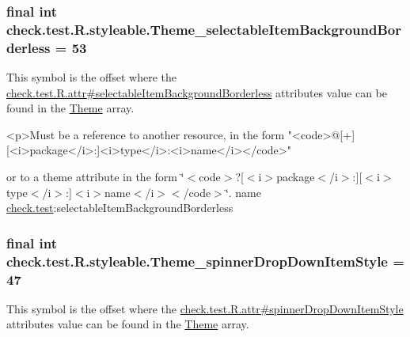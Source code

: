 \subsubsection[{Theme\+\_\+selectable\+Item\+Background\+Borderless}]{\setlength{\rightskip}{0pt plus 5cm}final int check.\+test.\+R.\+styleable.\+Theme\+\_\+selectable\+Item\+Background\+Borderless = 53\hspace{0.3cm}{\ttfamily [static]}}\label{classcheck_1_1test_1_1_r_1_1styleable_ab577cbb82ea3ae0fddb617a7cbc27530}
This symbol is the offset where the \hyperlink{classcheck_1_1test_1_1_r_1_1attr_a62db15ed42075eacd557934728d69a02}{check.\+test.\+R.\+attr\#selectable\+Item\+Background\+Borderless} attribute\textquotesingle{}s value can be found in the \hyperlink{classcheck_1_1test_1_1_r_1_1styleable_acca726d02016a0cf607782ec3a436a81}{Theme} array.

\begin{DoxyVerb}      <p>Must be a reference to another resource, in the form "<code>@[+][<i>package</i>:]<i>type</i>:<i>name</i></code>"
\end{DoxyVerb}
 or to a theme attribute in the form \char`\"{}$<$code$>$?\mbox{[}$<$i$>$package$<$/i$>$\+:\mbox{]}\mbox{[}$<$i$>$type$<$/i$>$\+:\mbox{]}$<$i$>$name$<$/i$>$$<$/code$>$\char`\"{}.  name \hyperlink{namespacecheck_1_1test}{check.\+test}\+:selectable\+Item\+Background\+Borderless \hypertarget{classcheck_1_1test_1_1_r_1_1styleable_ac74684f630293fb28782a9ce322bad2c}{}
\subsubsection[{Theme\+\_\+spinner\+Drop\+Down\+Item\+Style}]{\setlength{\rightskip}{0pt plus 5cm}final int check.\+test.\+R.\+styleable.\+Theme\+\_\+spinner\+Drop\+Down\+Item\+Style = 47\hspace{0.3cm}{\ttfamily [static]}}\label{classcheck_1_1test_1_1_r_1_1styleable_ac74684f630293fb28782a9ce322bad2c}
This symbol is the offset where the \hyperlink{classcheck_1_1test_1_1_r_1_1attr_a020a7df4dde5cf057bd1e5101a5782dc}{check.\+test.\+R.\+attr\#spinner\+Drop\+Down\+Item\+Style} attribute\textquotesingle{}s value can be found in the \hyperlink{classcheck_1_1test_1_1_r_1_1styleable_acca726d02016a0cf607782ec3a436a81}{Theme} array.

